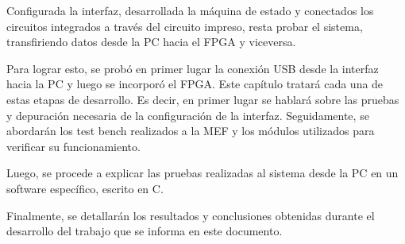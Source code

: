 %
%

Configurada la interfaz, desarrollada la máquina de estado y conectados los circuitos integrados a través del circuito impreso, resta probar el sistema, transfiriendo datos desde la PC hacia el FPGA y viceversa.

Para lograr esto, se probó en primer lugar la conexión USB desde la interfaz hacia la PC y luego se incorporó el FPGA. Este capítulo tratará cada una de estas etapas de desarrollo. Es decir, en primer lugar se hablará sobre las pruebas y depuración necesaria de la configuración de la interfaz. Seguidamente, se abordarán los test bench realizados a la MEF y los módulos utilizados para verificar su funcionamiento.

Luego, se procede a explicar las pruebas realizadas al sistema desde la PC en un software específico, escrito en C.

Finalmente, se detallarán los resultados y conclusiones obtenidas durante el desarrollo del trabajo que se informa en este documento.